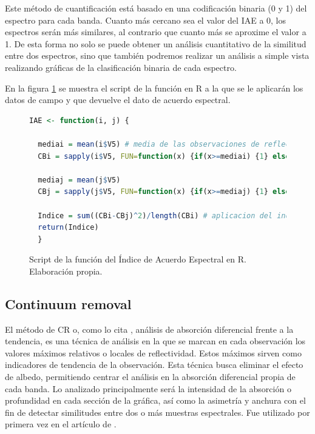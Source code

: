 Este método de cuantificación está basado en una codificación binaria (0 y 1) del espectro para cada banda. Cuanto más cercano sea el valor del \ac{IAE} a 0, los espectros serán más similares, al contrario que cuanto más se aproxime el valor a 1. De esta forma no solo se puede obtener un análisis cuantitativo de la similitud entre dos espectros, sino que también podremos realizar un análisis a simple vista realizando gráficas de la clasificación binaria de cada espectro.\Sep

En la figura \ref{fig:IAE} se muestra el script de la función en R a la que se le aplicarán los datos de campo y que devuelve el dato de acuerdo espectral.

\begin{figure}
\centering
\begin{lstlisting}[language=R]
  IAE <- function(i, j) {
  
  mediai = mean(i$V5) # media de las observaciones de reflectividad
  CBi = sapply(i$V5, FUN=function(x) {if(x>=mediai) {1} else {0}}) # creacion de la codificacion binaria
  
  mediaj = mean(j$V5)
  CBj = sapply(j$V5, FUN=function(x) {if(x>=mediaj) {1} else {0}})
  	
  Indice = sum((CBi-CBj)^2)/length(CBi) # aplicacion del indice
  return(Indice)  
  }
\end{lstlisting}
\caption[Función de Índice de Acuerdo Espectral]{Script de la función del Índice de Acuerdo Espectral en R. Elaboración propia.}
\label{fig:IAE}
\end{figure}

\subsection{Continuum removal}
\label{subsec:Continuum_removal}

El método de \ac{CR} o, como lo cita \cite{chuvieco2002teledeteccion}, análisis de absorción diferencial frente a la tendencia, es una técnica de análisis en la que se marcan en cada observación los valores máximos relativos o locales de reflectividad. Estos máximos sirven como indicadores de tendencia de la observación. Esta técnica busca eliminar el efecto de albedo, permitiendo centrar el análisis en la absorción diferencial propia de cada banda. Lo analizado principalmente será la intensidad de la absorción o profundidad en cada sección de la gráfica, así como la asimetría y anchura con el fin de detectar similitudes entre dos o más muestras espectrales. Fue utilizado por primera vez en el artículo de \cite{kokaly1999spectroscopic}.\Sep

